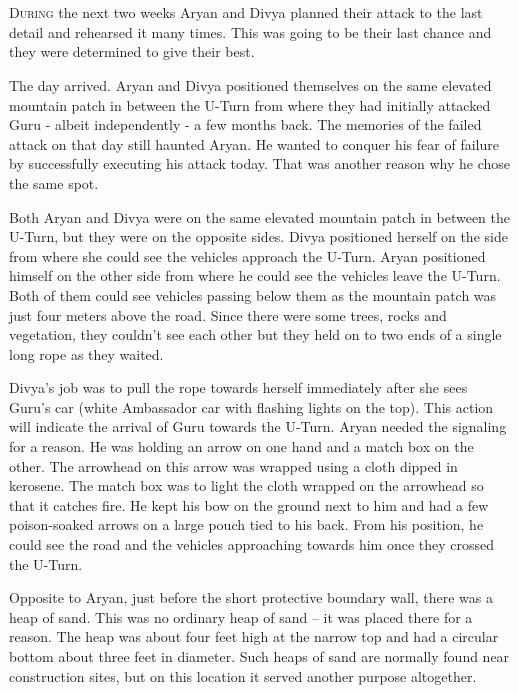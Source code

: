\chapter{}

\lettrine{D}{uring} the next two weeks Aryan and Divya planned their attack to the last
detail and rehearsed it many times. This was going to be their last chance and
they were determined to give their best.

The day arrived. Aryan and Divya positioned themselves on the same elevated
mountain patch in between the U-Turn from where they had initially attacked Guru
- albeit independently - a few months back. The memories of the failed attack on
that day still haunted Aryan. He wanted to conquer his fear of failure by
successfully executing his attack today. That was another reason why he chose
the same spot.

Both Aryan and Divya were on the same elevated mountain patch in between the
U-Turn, but they were on the opposite sides. Divya positioned herself on the
side from where she could see the vehicles approach the U-Turn. Aryan positioned
himself on the other side from where he could see the vehicles leave the U-Turn.
Both of them could see vehicles passing below them as the mountain patch was
just four meters above the road. Since there were some trees, rocks and
vegetation, they couldn't see each other but they held on to two ends of a
single long rope as they waited.

Divya's job was to pull the rope towards herself immediately after she sees
Guru's car (white Ambassador car with flashing lights on the top). This action
will indicate the arrival of Guru towards the U-Turn. Aryan needed the signaling
for a reason. He was holding an arrow on one hand and a match box on the other.
The arrowhead on this arrow was wrapped using a cloth dipped in kerosene. The
match box was to light the cloth wrapped on the arrowhead so that it catches
fire. He kept his bow on the ground next to him and had a few poison-soaked
arrows on a large pouch tied to his back. From his position, he could see the
road and the vehicles approaching towards him once they crossed the U-Turn.

Opposite to Aryan, just before the short protective boundary wall, there was a
heap of sand. This was no ordinary heap of sand – it was placed there for a
reason. The heap was about four feet high at the narrow top and had a circular
bottom about three feet in diameter. Such heaps of sand are normally found near
construction sites, but on this location it served another purpose altogether.

